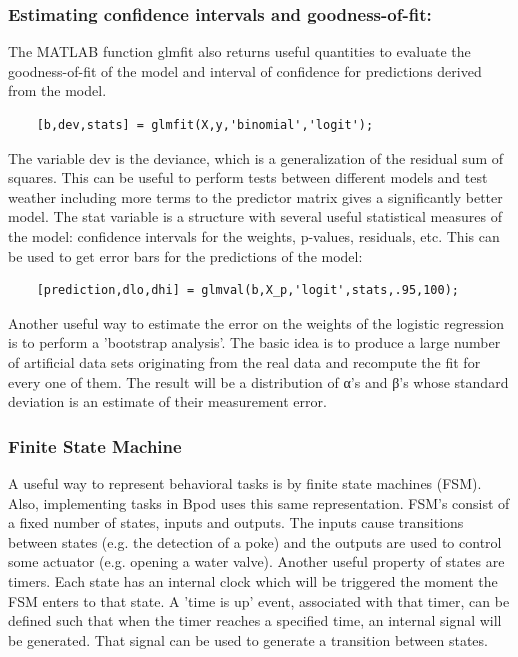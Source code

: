 \documentclass[a4paper]{report}
\begin{document}
\subsubsection*{Estimating confidence intervals and goodness-of-fit:}

The MATLAB function glmfit also returns useful quantities to evaluate the goodness-of-fit of the model and interval of confidence for predictions derived from the model.

\begin{verbatim}
	[b,dev,stats] = glmfit(X,y,'binomial','logit');
\end{verbatim}

The variable dev is the deviance, which is a generalization of the residual sum of squares. This can be useful to perform tests between different models and test weather including more terms to the predictor matrix gives a significantly better model. The stat variable is a structure with several useful statistical measures of the model: confidence intervals for the weights, p-values, residuals, etc. This can be used to get error bars for the predictions of the model:

\begin{verbatim}
	[prediction,dlo,dhi] = glmval(b,X_p,'logit',stats,.95,100);
\end{verbatim}

Another useful way to estimate the error on the weights of the logistic regression is to perform a 'bootstrap analysis'. The basic idea is to produce a large number of artificial data sets originating from the real data and recompute the fit for every one of them. The result will be a distribution of α's and β's whose standard deviation is an estimate of their measurement error.

\subsubsection*{Finite State Machine}

A useful way to represent behavioral tasks is by finite state machines (FSM). Also, implementing tasks in Bpod uses this same representation. FSM's consist of a fixed number of states, inputs and outputs. The inputs cause transitions between states (e.g. the detection of a poke) and the outputs are used to control some actuator (e.g. opening a water valve). Another useful property of states are timers. Each state has an internal clock which will be triggered the moment the FSM enters to that state. A 'time is up' event, associated with that timer, can be defined such that when the timer reaches a specified time, an internal signal will be generated. That signal can be used to generate a transition between states.
\end{document}
